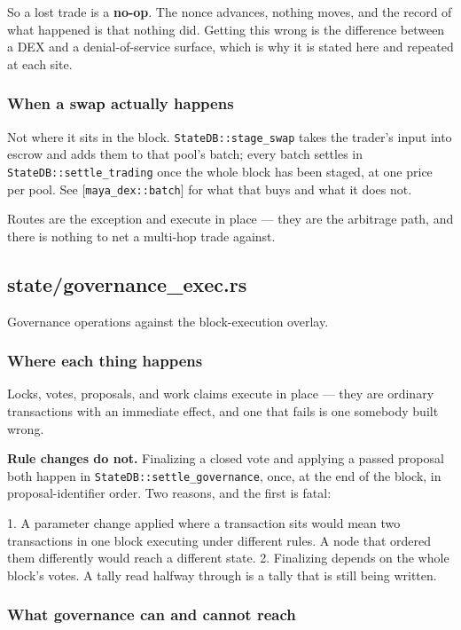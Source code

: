 \documentclass[11pt,a4paper]{article}
\begin{document}
So a lost trade is a \textbf{no-op}. The nonce advances, nothing moves, and the
record of what happened is that nothing did. Getting this wrong is the
difference between a DEX and a denial-of-service surface, which is why it is
stated here and repeated at each site.

\subsubsection{When a swap actually happens}

Not where it sits in the block. \texttt{StateDB::stage\_swap} takes the trader's
input into escrow and adds them to that pool's batch; every batch settles in
\texttt{StateDB::settle\_trading} once the whole block has been staged, at one
price per pool. See [\texttt{maya\_dex::batch}] for what that buys and what it does
not.

Routes are the exception and execute in place — they are the arbitrage path,
and there is nothing to net a multi-hop trade against.

\subsection{state/governance\_exec.rs}
Governance operations against the block-execution overlay.

\subsubsection{Where each thing happens}

Locks, votes, proposals, and work claims execute in place — they are
ordinary transactions with an immediate effect, and one that fails is one
somebody built wrong.

\textbf{Rule changes do not.} Finalizing a closed vote and applying a passed
proposal both happen in \texttt{StateDB::settle\_governance}, once, at the end of
the block, in proposal-identifier order. Two reasons, and the first is
fatal:

1. A parameter change applied where a transaction sits would mean two
   transactions in one block executing under different rules. A node that
   ordered them differently would reach a different state.
2. Finalizing depends on the whole block's votes. A tally read halfway
   through is a tally that is still being written.

\subsubsection{What governance can and cannot reach}
\end{document}

